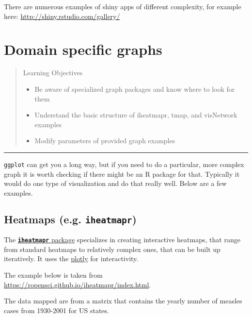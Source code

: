 \documentclass[]{book}
\providecommand{\tightlist}{%
  \setlength{\itemsep}{0pt}\setlength{\parskip}{0pt}}
\theoremstyle{definition}
\theoremstyle{definition}
\theoremstyle{definition}
\theoremstyle{remark}
\begin{document}
There are numerous examples of shiny apps of different complexity, for
example here: \url{http://shiny.rstudio.com/gallery/}

\chapter{Domain specific graphs}\label{domains}

\begin{quote}
Learning Objectives

\begin{itemize}
\tightlist
\item
  Be aware of specialized graph packages and know where to look for them
\item
  Understand the basic structure of iheatmapr, tmap, and visNetwork
  examples
\item
  Modify parameters of provided graph examples
\end{itemize}
\end{quote}

\begin{center}\rule{0.5\linewidth}{\linethickness}\end{center}

\texttt{ggplot} can get you a long way, but if you need to do a
particular, more complex graph it is worth checking if there might be an
R package for that. Typically it would do one type of visualization and
do that really well. Below are a few examples.

\section{\texorpdfstring{Heatmaps (e.g.
\textbf{\texttt{iheatmapr}})}{Heatmaps (e.g. iheatmapr)}}\label{heatmaps-e.g.-iheatmapr}

The
\href{https://CRAN.R-project.org/package=iheatmapr}{\textbf{\texttt{iheatmapr}}
package} specializes in creating interactive heatmaps, that range from
standard heatmaps to relatively complex ones, that can be built up
iteratively. It uses the \href{https://plot.ly/}{plotly} for
interactivity.

The example below is taken from
\url{https://ropensci.github.io/iheatmapr/index.html}.

The data mapped are from a matrix that contains the yearly number of
measles cases from 1930-2001 for US states.
\end{document}
